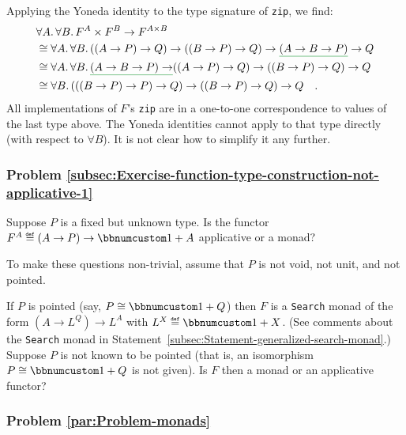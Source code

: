 Applying the Yoneda identity to the type signature of \lstinline!zip!,
we find:
\begin{align*}
 & \forall A.\,\forall B.\,F^{A}\times F^{B}\rightarrow F^{A\times B}\\
 & \cong\forall A.\,\forall B.\,((A\rightarrow P)\rightarrow Q)\rightarrow((B\rightarrow P)\rightarrow Q)\rightarrow\gunderline{(A\rightarrow B\rightarrow P)}\rightarrow Q\\
 & \cong\forall A.\,\forall B.\,\gunderline{(A\rightarrow B\rightarrow P)\rightarrow}((A\rightarrow P)\rightarrow Q)\rightarrow((B\rightarrow P)\rightarrow Q)\rightarrow Q\\
 & \cong\forall B.\,(((B\rightarrow P)\rightarrow P)\rightarrow Q)\rightarrow((B\rightarrow P)\rightarrow Q)\rightarrow Q\quad.
\end{align*}
All implementations of $F$\textsf{'}s \lstinline!zip! are in a one-to-one
correspondence to values of the last type above. The Yoneda identities
cannot apply to that type directly (with respect to $\forall B$).
It is not clear how to simplify it any further.

\subsubsection{Problem \label{subsec:Exercise-function-type-construction-not-applicative-1}\ref{subsec:Exercise-function-type-construction-not-applicative-1}}

Suppose $P$ is a fixed but unknown type. Is the functor $F^{A}\triangleq\left(A\rightarrow P\right)\rightarrow\bbnum 1+A$
applicative or a monad?

To make these questions non-trivial, assume that $P$ is not void,
not unit, and not pointed.

If $P$ is pointed (say, $P\cong\bbnum 1+Q$) then $F$ is a \lstinline!Search!
monad of the form $(A\rightarrow L^{Q})\rightarrow L^{A}$ with $L^{X}\triangleq\bbnum 1+X$.
(See comments about the \lstinline!Search! monad in Statement~\ref{subsec:Statement-generalized-search-monad}.)
Suppose $P$ is not known to be pointed (that is, an isomorphism $P\cong\bbnum 1+Q$
is not given). Is $F$ then a monad or an applicative functor? 

\subsubsection{Problem \label{par:Problem-monads}\ref{par:Problem-monads}}

